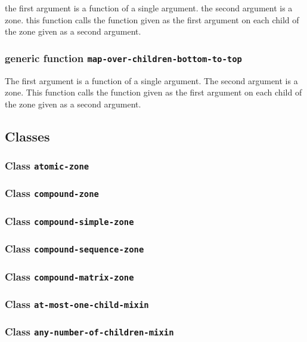 \documentclass{report}
\begin{document}
the first argument is a function of a single argument.  the second
argument is a zone.  this function calls the function given as the
first argument on each child of the zone given as a second argument.  

\subsubsection{generic function \texttt{map-over-children-bottom-to-top}}

The first argument is a function of a single argument.  The second
argument is a zone.  This function calls the function given as the
first argument on each child of the zone given as a second argument.  

\subsection{Classes}

\subsubsection{Class \texttt{atomic-zone}}

\subsubsection{Class \texttt{compound-zone}}

\subsubsection{Class \texttt{compound-simple-zone}}

\subsubsection{Class \texttt{compound-sequence-zone}}

\subsubsection{Class \texttt{compound-matrix-zone}}

\subsubsection{Class \texttt{at-most-one-child-mixin}}

\subsubsection{Class \texttt{any-number-of-children-mixin}}
\end{document}
